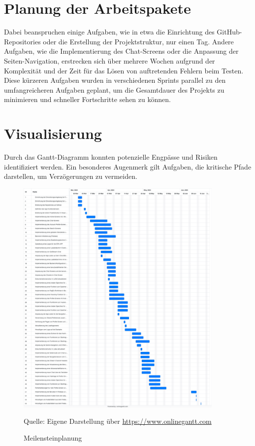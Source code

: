 \section{Planung der Arbeitspakete}
Dabei beanspruchen einige Aufgaben, wie in etwa die Einrichtung des GitHub-Repositories oder die Erstellung der Projektstruktur, nur einen Tag. 
Andere Aufgaben, wie die Implementierung des Chat-Screens oder die Anpassung der Seiten-Navigation, erstrecken sich über mehrere Wochen aufgrund der Komplexität und der Zeit für das Lösen von auftretenden Fehlern beim Testen.
Diese kürzeren Aufgaben wurden in verschiedenen Sprints parallel zu den umfangreicheren Aufgaben geplant, um die Gesamtdauer des Projekts zu minimieren und schneller Fortschritte sehen zu können.

\section{Visualisierung}
Durch das Gantt-Diagramm konnten potenzielle Engpässe und Risiken identifiziert werden.
Ein besonderes Augenmerk gilt Aufgaben, die kritische Pfade darstellen, um Verzögerungen zu vermeiden.

\begin{figure}[H]
    \setcounter{figure}{2} 
    \caption[Meilensteinplanung]{Meilensteinplanung}
	\centering
	\includegraphics[width=0.9\textwidth]{assets/figures/STH GANTT Diagramm.png}
	\begin{flushleft}
		Quelle: Eigene Darstellung über \url{https://www.onlinegantt.com}
	\end{flushleft}
\end{figure}


